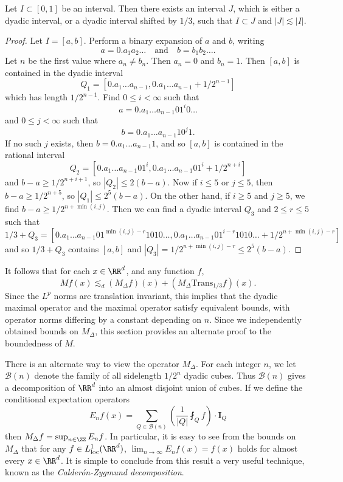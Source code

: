 \begin{lemma}
  Let $I \subset [0,1]$ be an interval. Then there exists an interval $J$, which is either a dyadic interval, or a dyadic interval shifted by $1/3$, such that $I \subset J$ and $|J| \lesssim |I|$.
\end{lemma}
\begin{proof}
  Let $I = [a,b]$. Perform a binary expansion of $a$ and $b$, writing
  \[ a = 0.a_1a_2 \dots \quad\text{and}\quad b = b_1 b_2 \dots. \]
  Let $n$ be the first value where $a_n \neq b_n$. Then $a_n = 0$ and $b_n = 1$. Then $[a,b]$ is contained in the dyadic interval
  \[ Q_1 = \left[ 0.a_1 \dots a_{n-1}, 0.a_1\dots a_{n-1} + 1/2^{n-1} \right] \]
  which has length $1/2^{n-1}$. Find $0 \leq i < \infty$ such that
  \[ a = 0.a_1 \dots a_{n-1} 0 1^i 0 \dots \]
  and $0 \leq j < \infty$ such that
  \[ b = 0.a_1 \dots a_{n-1} 1 0^j 1. \]
  If no such $j$ exists, then $b = 0.a_1 \dots a_{n-1} 1$, and so $[a,b]$ is contained in the rational interval
  \[ Q_2 = \left[ 0.a_1 \dots a_{n-1} 0 1^i, 0.a_1 \dots a_{n-1} 0 1^i + 1/2^{n+i} \right] \]
  and $b - a \geq 1/2^{n+i+1}$, so $|Q_2| \leq 2(b - a)$. Now if $i \leq 5$ or $j \leq 5$, then $b - a \geq 1/2^{n+5}$, so $|Q_1| \leq 2^5(b-a)$. On the other hand, if $i \geq 5$ and $j \geq 5$, we find $b - a \geq 1/2^{n+\min(i,j)}$. Then we can find a dyadic interval $Q_3$ and $2 \leq r \leq 5$ such that
  \[ 1/3 + Q_3 = \left[ 0.a_1 \dots a_{n-1} 0 1^{\min(i,j)-r} 1 0 1 0 \dots, 0.a_1 \dots a_{n-1} 0 1^{i-r} 1 0 1 0 \dots + 1/2^{n+\min(i,j)-r}  \right] \]
  and so $1/3 + Q_3$ contains $[a,b]$ and $|Q_3| = 1/2^{n+\min(i,j)-r} \leq 2^5 (b - a)$.
\end{proof}

It follows that for each $x \in \RR^d$, and any function $f$,
%
\[ Mf(x) \lesssim_d (M_\Delta f)(x) + (M_\Delta \text{Trans}_{1/3} f)(x). \]
%
Since the $L^p$ norms are translation invariant, this implies that the dyadic maximal operator and the maximal operator satisfy equivalent bounds, with operator norms differing by a constant depending on $n$. Since we independently obtained bounds on $M_\Delta$, this section provides an alternate proof to the boundedness of $M$.

There is an alternate way to view the operator $M_\Delta$. For each integer $n$, we let $\mathcal{B}(n)$ denote the family of all sidelength $1/2^n$ dyadic cubes. Thus $\mathcal{B}(n)$ gives a decomposition of $\RR^d$ into an almost disjoint union of cubes. If we define the conditional expectation operators
%
\[ E_n f(x) = \sum_{Q \in \mathcal{B}(n)} \left( \frac{1}{|Q|} \fint_Q f \right) \cdot \mathbf{I}_Q \]
%
then $M_\Delta f = \sup_{n \in \ZZ} E_n f$. In particular, it is easy to see from the bounds on $M_\Delta$ that for any $f \in L^1_{\text{loc}}(\RR^d)$, $\lim_{n \to \infty} E_n f(x) = f(x)$ holds for almost every $x \in \RR^d$. It is simple to conclude from this result a very useful technique, known as the \emph{Calder\'{o}n-Zygmund decomposition}.


